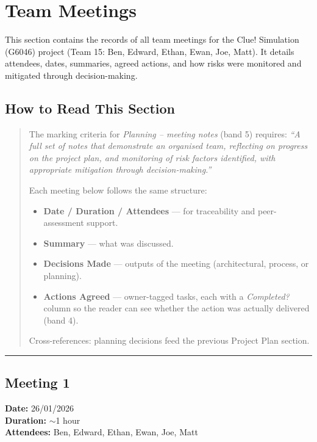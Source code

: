 \section{Team Meetings}
\label{sect:meeting}

This section contains the records of all team meetings for the Clue! Simulation (G6046) project (Team 15: Ben, Edward, Ethan, Ewan, Joe, Matt). It details attendees, dates, summaries, agreed actions, and how risks were monitored and mitigated through decision-making.

\subsection{How to Read This Section}

\begin{quote}
The marking criteria for \textit{Planning -- meeting notes} (band 5) requires:
\textit{``A full set of notes that demonstrate an organised team, reflecting on progress on the project plan, and monitoring of risk factors identified, with appropriate mitigation through decision-making.''}

Each meeting below follows the same structure:
\begin{itemize}
    \item \textbf{Date / Duration / Attendees} --- for traceability and peer-assessment support.
    \item \textbf{Summary} --- what was discussed.
    \item \textbf{Decisions Made} --- outputs of the meeting (architectural, process, or planning).
    \item \textbf{Actions Agreed} --- owner-tagged tasks, each with a \textit{Completed?} column so the reader can see whether the action was actually delivered (band 4).
\end{itemize}

Cross-references: planning decisions feed the previous Project Plan section.
\end{quote}

\smallskip
\hrule
\smallskip

\subsection{Meeting 1}
\textbf{Date:} 26/01/2026 \\
\textbf{Duration:} $\sim$1 hour \\
\textbf{Attendees:} Ben, Edward, Ethan, Ewan, Joe, Matt

